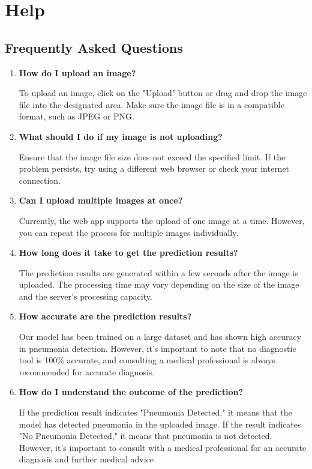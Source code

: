 %


\chapter{Help}

\section{Frequently Asked Questions}

\begin{enumerate}
	\item \textbf{How do I upload an image?}
	
To upload an image, click on the "Upload" button or drag and drop the image file into the designated area. Make sure the image file is in a compatible format, such as JPEG or PNG.
	
	\item \textbf{What should I do if my image is not uploading?}
	
Ensure that the image file size does not exceed the specified limit. If the problem persists, try using a different web browser or check your internet connection.
	
	\item \textbf{Can I upload multiple images at once?}
	
Currently, the web app supports the upload of one image at a time. However, you can repeat the process for multiple images individually.
	
	\item \textbf{How long does it take to get the prediction results?}
	
The prediction results are generated within a few seconds after the image is uploaded. The processing time may vary depending on the size of the image and the server's processing capacity.
	
	\item \textbf{How accurate are the prediction results?}
	
Our model has been trained on a large dataset and has shown high accuracy in pneumonia detection. However, it's important to note that no diagnostic tool is 100\% accurate, and consulting a medical professional is always recommended for accurate diagnosis.

	\item \textbf {How do I understand the outcome of the prediction?}
	
If the prediction result indicates "Pneumonia Detected," it means that the model has detected pneumonia in the uploaded image. If the result indicates "No Pneumonia Detected," it means that pneumonia is not detected. However, it's important to consult with a medical professional for an accurate diagnosis and further medical advice
	

\end{enumerate}

